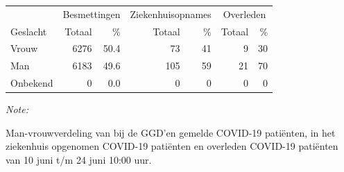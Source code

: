 \documentclass[
  english,
  man,floatsintext]{apa6}
\begin{document}
\begin{table}
\centering\begingroup\fontsize{11}{13}\selectfont

\begin{threeparttable}
\begin{tabular}{lrrrrrr}
\toprule
\multicolumn{1}{c}{ } & \multicolumn{2}{c}{Besmettingen} & \multicolumn{2}{c}{Ziekenhuisopnames} & \multicolumn{2}{c}{Overleden} \\
\cmidrule(l{3pt}r{3pt}){2-3} \cmidrule(l{3pt}r{3pt}){4-5} \cmidrule(l{3pt}r{3pt}){6-7}
Geslacht & Totaal & \% & Totaal & \% & Totaal & \%\\
\midrule
Vrouw & 6276 & 50.4 & 73 & 41 & 9 & 30\\
Man & 6183 & 49.6 & 105 & 59 & 21 & 70\\
Onbekend & 0 & 0.0 & 0 & 0 & 0 & 0\\
\bottomrule
\end{tabular}
\begin{tablenotes}
\item \textit{Note: } 
\item Man-vrouwverdeling van bij de GGD’en gemelde COVID-19 patiënten, in het ziekenhuis opgenomen COVID-19 patiënten en overleden COVID-19 patiënten van 10 juni t/m 24 juni 10:00 uur.
\end{tablenotes}
\end{threeparttable}
\endgroup{}
\end{table}
\newpage
\end{document}
